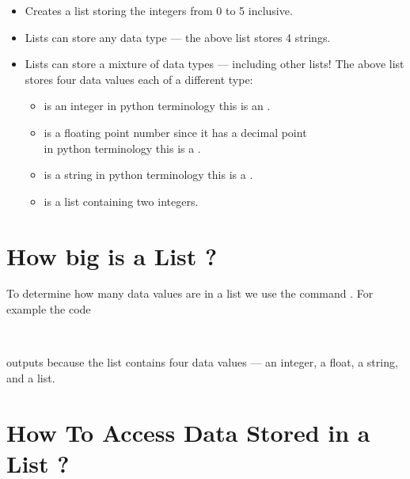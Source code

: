 \documentclass{coderdojo}
\begin{document}
\begin{itemize}
\item {}

Creates a list storing the integers from 0 to 5 inclusive.

\item {}

Lists can store any data type --- the above list stores 4 strings.

\item {}

Lists can store a mixture of data types --- including other lists!
The above list stores four data values each of a different type:
	\begin{itemize}
	\item {} is an integer \hfill in python terminology this is an .
	\item {} is a floating point number since it has a decimal point
	\\\mbox{}\hfill
	 \hfill in python terminology this is a .
	 \item {} is a string
	 \hfill in python terminology this is a .
	 \item \code{[2,3]} is a list containing two integers.
	\end{itemize}

\end{itemize}

\section*{How big is a  List ?}

To determine how many data values are in a list we use the command . For example the code

\hspace*{3cm}\begin{minipage}{\textwidth}
\\
\end{minipage}

\vspace{3pt}
outputs  because the list contains four data values --- an integer, a float, a string, and a list.

\section*{How To Access Data Stored in a List ?}
\end{document}
